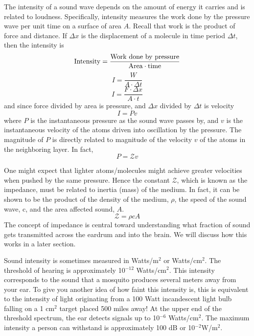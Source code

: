 The intensity of a sound wave depends on the amount of energy it carries and is related to loudness.  Specifically, intensity measures the work done by the pressure wave per unit time on a surface of area $A$.  Recall that work is the product of force and distance.  If $\Delta x$ is the displacement of a molecule in time period $\Delta t$, then the intensity is
$${\rm Intensity} = \frac{\rm Work~done~by~pressure}{{\rm Area}\cdot{\rm time}}$$
$$I = \frac{W}{A \cdot\Delta t}$$
$$I = \frac{F\cdot \Delta x}{A\cdot t}$$
and since force divided by area is pressure, and $\Delta x$ divided by $\Delta t$ is velocity
\begin{equation}\label{eqn3-2}
I = P v
\end{equation}
where $P$ is the instantaneous pressure as the sound wave passes by, and $v$ is the instantaneous velocity of the atoms driven into oscillation by the pressure.  The magnitude of $P$ is directly related to magnitude of the velocity $v$ of the atoms in the neighboring layer. In fact,
\begin{equation}\label{eqn3-3}
P=\mathcal{Z} v
\end{equation}       

One might expect that lighter atoms/molecules might achieve greater velocities when pushed by the same pressure. Hence the constant $\mathcal{Z}$, which is known as the impedance, must be related to inertia (mass) of the medium. In fact, it can be shown to be the product of the density of the medium, $\rho$, the speed of the sound wave, c, and the area affected sound, $A$.    
\begin{equation}\label{eqn3-4}
\mathcal{Z} = \rho c A
\end{equation}
The concept of impedance is central toward understanding what fraction of sound gets transmitted across the eardrum and into the brain.  We will discuss how this works in a later section.

Sound intensity is sometimes measured in Watts/m$^2$ or Watts/cm$^2$.  The threshold of hearing is approximately 10$^{-12}$ Watts/cm$^2$.  This intensity corresponds to the sound that a mosquito produces several meters away from your ear. To give you another idea of how faint this intensity is, this is equivalent to the intensity of light originating from a 100 Watt incandescent light bulb falling on a 1 cm$^2$ target placed 500 miles away!  At the upper end of the threshold spectrum, the ear detects signals up to 10$^{-6}$ Watts/cm$^2$. The maximum intensity a person can withstand is approximately 100 dB or 10$^{-2}$W/m$^2$.
 
